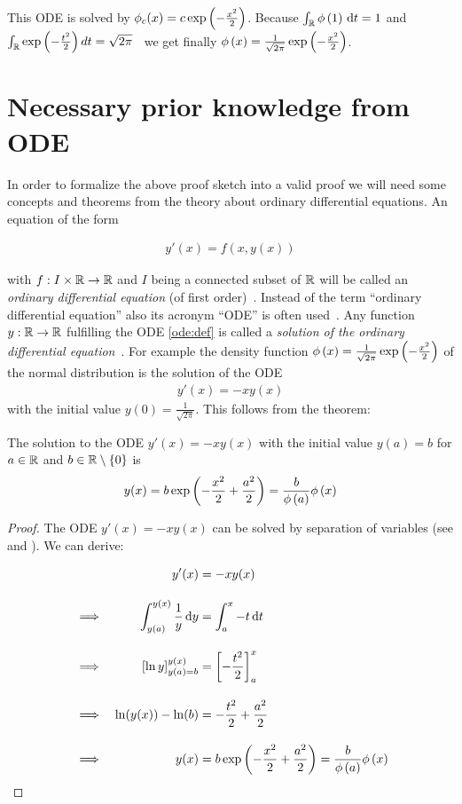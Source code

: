 This ODE is solved by $\phi_c(x) = c \exp\left( {-\frac{x^2}2} \right)$. Because $\int_\mathbb R \phi\left( {1} \right) \,\mathrm d{t} = 1$ and $\int_\mathbb R \exp\left( {-\frac{t^2}2} \right) d{t} = \sqrt{2\pi}$~\cite[p. 47]{georgii} we get finally $\phi\left( {x} \right) = \frac{1}{\sqrt{2\pi}} \exp\left( {-\frac{x^2}2} \right)$.

\section{Necessary prior knowledge from ODE}

In order to formalize the above proof sketch into a valid proof we will need some concepts and theorems from the theory about ordinary differential equations. An equation of the form

\begin{align} \label{ode:def}
  y'(x) = f(x,y(x))
\end{align}

with $f:I \times \mathbb R \to \mathbb R$ and $I$ being a connected subset of $\mathbb R$ will be called an \emph{ordinary differential equation} (of first order)~\cite[p. 465]{stoer}\cite{wiki:ode}. Instead of the term ``ordinary differential equation'' also its acronym ``ODE'' is often used~\cite[p. 2]{ricardo}\cite{wiki:ode}. Any function $y:\mathbb R\to\mathbb R$ fulfilling the ODE \eqref{ode:def} is called a \emph{solution of the ordinary differential equation}~\cite[p. 8]{ricardo}\cite{wiki:ode}. For example the density function $\phi\left( {x} \right) = \frac{1}{\sqrt{2\pi}} \exp\left( {-\frac{x^2}2} \right)$ of the normal distribution is the solution of the ODE
\begin{align}
  y'(x) = -xy(x)
\end{align}
with the initial value $y(0) = \frac{1}{\sqrt{2\pi}}$. This follows from the theorem:

\begin{theorem} \label{chr_ode}
  The solution to the ODE $y'(x) = -xy(x)$ with the initial value $y(a)=b$ for $a\in\mathbb R$ and $b\in \mathbb R\setminus\{0\}$ is
  \begin{align}
    y(x) = b \exp\left( {-\frac{x^2}2+\frac{a^2}2} \right) = \frac{b}{\phi\left( {a} \right)} \phi\left( {x} \right)
  \end{align}
\end{theorem}

\begin{proof}
  The ODE $y'(x)=-xy(x)$ can be solved by separation of variables (see \cite[p. 28]{ricardo} and \cite{wiki:separation}). We can derive:

  \begin{align}
      && y'(x)& =-xy(x) \bnl
      &\implies & \int_{y(a)}^{y(x)} \frac 1y \d{y} & = \int_a^x -t \d{t} \bnl
      &\implies & \left[\ln{y}\right]^{y(x)}_{y(a)=b} & = \left[-\frac{t^2}2\right]_a^x \bnl
      &\implies & \ln(y(x))-\ln(b) &= -\frac{t^2}2 + \frac{a^2}2 \bnl
      &\implies & y(x) &= b \fexp{-\frac{x^2}2 + \frac{a^2}2} = \frac b{\fphi{a}}\fphi{x}
  \end{align}
\end{proof}

